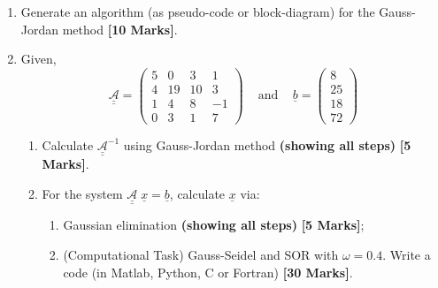 \documentclass[12pts,a4paper,amsmath,amssymb,floatfix]{article}%
\begin{document}
\begin{enumerate}[{\bf Problem 1:}]
\begin{enumerate}
  \item\label{comp1} Write a code (in Matlab, Python, C or Fortran) that calculates $\mathcal{C}_{i}^{j}$ for $j\in\left\{1,...,30\right\}$. Plot $x \times \mathcal{C}_{i}^{j}$ for times (a) t = 0s, (b) t = 5s, (c) t = 10s and (d) t = 15s.  {\bf [40 Marks]}
  \item At t = 11s, the observed concentration (obtained from non-invasive sensor measurements) was:
\begin{displaymath}
\mathcal{C}^{\text{obs}}\left(x,t=15s\right)= \left(0.15\;\; 10.07\;\; 9.93\;\; 10.31\;\; 9.89\;\; 9.75\;\; 9.73\;\; 9.35\;\; 6.01\;\; 10.02\right)^{T}
\end{displaymath}
The sensors were placed in the same coordinates as the original simulated mesh grid. How would the engineer quantitatively assess the accuracy of her simulated data with respect to the measurements? {\bf [10 Marks]}

\end{enumerate}
%
\item Generate an algorithm (as pseudo-code or block-diagram) for the Gauss-Jordan method {\bf [10 Marks]}. 
%
\item Given,
 \begin{displaymath}
             \underline{\underline{\mathcal{A}}}=\begin{pmatrix}
                5 & 0 & 3 & 1 \\ 4 & 19 & 10 & 3 \\ 1 & 4 & 8 & -1 \\ 0 & 3 & 1 & 7
             \end{pmatrix}\;\;\; \text{ and }\;\;\; \underline{b}= \begin{pmatrix}
                8 \\ 25 \\ 18 \\ 72
             \end{pmatrix}
\end{displaymath}
\begin{enumerate}
\item Calculate ${\underline{\underline{\mathcal{A}}}}^{-1}$ using Gauss-Jordan method {\bf (showing all steps)} {\bf [5 Marks]}.
\item For the system ${\underline{\underline{\mathcal{A}}}} \;\underline{x} =\underline{b}$, calculate $\underline{x}$ via:
\begin{enumerate}
\item Gaussian elimination {\bf (showing all steps)} {\bf [5 Marks]};
\item\label{comp2} (Computational Task) Gauss-Seidel and SOR with $\omega=0.4$.  Write a code (in Matlab, Python, C or Fortran) {\bf [30 Marks]}.
\end{enumerate}
\end{enumerate}
%
\end{enumerate}
\end{document}
